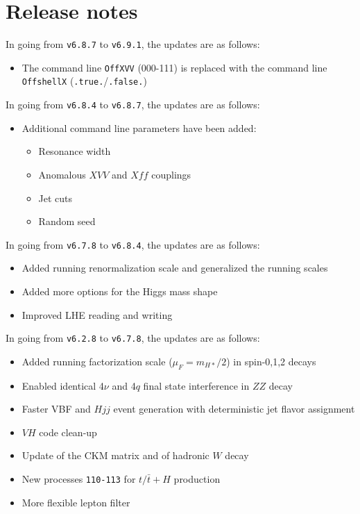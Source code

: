 \documentclass[aps,superscriptaddress,nofootinbib]{revtex4}
\begin{document}

\section{ Release notes }

\noindent
In going from \verb|v6.8.7| to \verb|v6.9.1|, the updates are as follows:

\begin{itemize}
\item The command line \verb|OffXVV| (000-111) is replaced with the command line \verb|OffshellX| (\verb|.true.|/\verb|.false.|)
\end{itemize}

\noindent
In going from \verb|v6.8.4| to \verb|v6.8.7|, the updates are as follows:

\begin{itemize}
\item Additional command line parameters have been added:
\begin{itemize}
\item Resonance width
\item Anomalous $XVV$ and $Xff$ couplings
\item Jet cuts
\item Random seed
\end{itemize}
\end{itemize}

\noindent
In going from \verb|v6.7.8| to \verb|v6.8.4|, the updates are as follows:

\begin{itemize}
\item Added running renormalization scale and generalized the running scales
\item Added more options for the Higgs mass shape
\item Improved LHE reading and writing
\end{itemize}

\noindent
In going from \verb|v6.2.8| to \verb|v6.7.8|, the updates are as follows:

\begin{itemize}
\item Added running factorization scale ($\mu_F=m_{H*}/2$) in spin-0,1,2 decays
\item Enabled identical 4$\nu$ and 4$q$ final state interference in $ZZ$ decay
\item Faster VBF and $Hjj$ event generation with deterministic jet flavor assignment
\item $VH$ code clean-up
\item Update of the CKM matrix and of hadronic $W$ decay
\item New processes \verb|110-113| for $t/\bar{t}+H$ production
\item More flexible lepton filter
\end{itemize}
\end{document}
